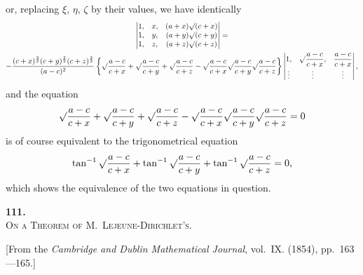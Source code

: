 \documentclass[11pt]{article}
\begin{document}
or, replacing $\xi$, $\eta$, $\zeta$ by their values, we have identically
\begin{multline*}
\begin{vmatrix}
1, & x, & (a+x)\surd(c+x) \\
1, & y, & (a+y)\surd(c+y) \\
1, & z, & (a+z)\surd(c+z)
\end{vmatrix} = \\
- \frac{(c+x)^{\frac{3}{2}}(c+y)^{\frac{3}{2}}(c+z)^{\frac{3}{2}}}{(a-c)^2}
\left\{
\surd\frac{a-c}{c+x} + \surd\frac{a-c}{c+y} + \surd\frac{a-c}{c+z}
- \surd\frac{a-c}{c+x}\surd\frac{a-c}{c+y}\surd\frac{a-c}{c+z}
\right\}
\begin{vmatrix}
1, & \surd\dfrac{a-c}{c+x}, & \dfrac{a-c}{c+x} \\
\vdots & \vdots & \vdots
\end{vmatrix},
\end{multline*}
and the equation
\[
\surd\frac{a-c}{c+x} + \surd\frac{a-c}{c+y} + \surd\frac{a-c}{c+z}
- \surd\frac{a-c}{c+x}\surd\frac{a-c}{c+y}\surd\frac{a-c}{c+z} = 0
\]
is of course equivalent to the trigonometrical equation
\[
\tan^{-1}\surd\frac{a-c}{c+x} + \tan^{-1}\surd\frac{a-c}{c+y} + \tan^{-1}\surd\frac{a-c}{c+z} = 0,
\]
which shows the equivalence of the two equations in question.


\newpage
\setcounter{page}{47}

\begin{center}
{\Large\bfseries 111.}\\[0.5em]
{\large\scshape On a Theorem of M.~Lejeune-Dirichlet's.}
\end{center}
\vspace{0.3em}
\begin{center}
\small [From the \textit{Cambridge and Dublin Mathematical Journal}, vol.~IX. (1854), pp.~163---165.]
\end{center}
\vspace{0.5em}
\end{document}
